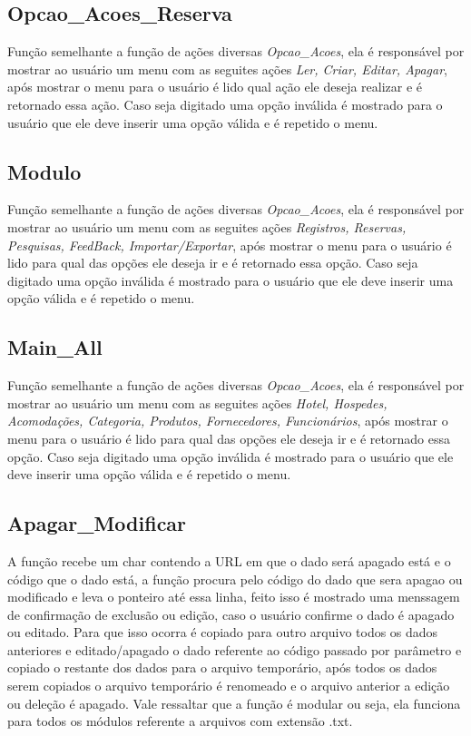 \documentclass{article}
\begin{document}
\subsection{Opcao\_Acoes\_Reserva}
	Função semelhante a função de ações diversas \textit{Opcao\_Acoes}, ela é responsável por mostrar ao usuário um menu com as seguites ações \textit{Ler, Criar, Editar, Apagar}, após mostrar o menu para o usuário é lido qual ação ele deseja realizar e é retornado essa ação. Caso seja digitado uma opção inválida é mostrado para o usuário que ele deve inserir uma opção válida e é repetido o menu.
\subsection{Modulo}
	Função semelhante a função de ações diversas \textit{Opcao\_Acoes}, ela é responsável por mostrar ao usuário um menu com as seguites ações \textit{Registros, Reservas, Pesquisas, FeedBack, Importar/Exportar}, após mostrar o menu para o usuário é lido para qual das opções ele deseja ir e é retornado essa opção. Caso seja digitado uma opção inválida é mostrado para o usuário que ele deve inserir uma opção válida e é repetido o menu.
\subsection{Main\_All}
	Função semelhante a função de ações diversas \textit{Opcao\_Acoes}, ela é responsável por mostrar ao usuário um menu com as seguites ações \textit{Hotel, Hospedes, Acomodações, Categoria, Produtos, Fornecedores, Funcionários}, após mostrar o menu para o usuário é lido para qual das opções ele deseja ir e é retornado essa opção. Caso seja digitado uma opção inválida é mostrado para o usuário que ele deve inserir uma opção válida e é repetido o menu.
\subsection{Apagar\_Modificar}
	A função recebe um char contendo a URL em que o dado será apagado está e o código que o dado está, a função procura pelo código do dado que sera apagao ou modificado e leva o ponteiro até essa linha, feito isso é mostrado uma menssagem de confirmação de exclusão ou edição, caso o usuário confirme o dado é apagado ou editado. Para que isso ocorra é copiado para outro arquivo todos os dados anteriores e editado/apagado o dado referente ao código passado por parâmetro e copiado o restante dos dados para o arquivo temporário, após todos os dados serem copiados o arquivo temporário é renomeado e o arquivo anterior a edição ou deleção é apagado. Vale ressaltar que a função é modular ou seja, ela funciona para todos os módulos referente a arquivos com extensão .txt.
\end{document}
